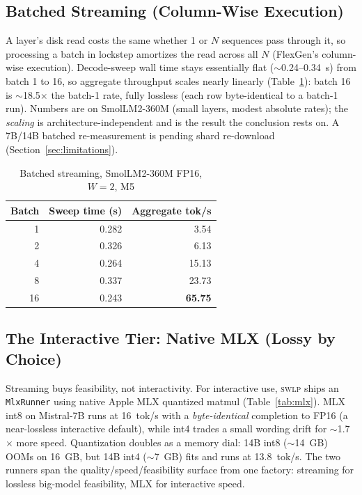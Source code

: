 \documentclass[10pt,a4paper]{article}
\newcommand{\swlp}{\textsc{swlp}}
\begin{document}
\subsection{Batched Streaming (Column-Wise Execution)}
\label{subsec:batch}

A layer's disk read costs the same whether 1 or $N$ sequences pass through it, so
processing a batch in lockstep amortizes the read across all $N$ (FlexGen's
column-wise execution). Decode-sweep wall time stays essentially flat
($\sim$0.24--0.34~s) from batch 1 to 16, so aggregate throughput scales nearly
linearly (Table~\ref{tab:batch}): batch 16 is $\sim$18.5$\times$ the batch-1 rate,
fully lossless (each row byte-identical to a batch-1 run). Numbers are on
SmolLM2-360M (small layers, modest absolute rates); the \emph{scaling} is
architecture-independent and is the result the conclusion rests on. A 7B/14B
batched re-measurement is pending shard re-download (Section~\ref{sec:limitations}).

\begin{table}[htbp]
\centering
\caption{Batched streaming, SmolLM2-360M FP16, $W=2$, M5}
\label{tab:batch}
\begin{tabular}{@{}rrr@{}}
\toprule
\textbf{Batch} & \textbf{Sweep time (s)} & \textbf{Aggregate tok/s} \\
\midrule
1 & 0.282 & 3.54 \\
2 & 0.326 & 6.13 \\
4 & 0.264 & 15.13 \\
8 & 0.337 & 23.73 \\
16 & 0.243 & \textbf{65.75} \\
\bottomrule
\end{tabular}
\end{table}

\subsection{The Interactive Tier: Native MLX (Lossy by Choice)}
\label{subsec:mlx}

Streaming buys feasibility, not interactivity. For interactive use, \swlp{} ships
an \texttt{MlxRunner} using native Apple MLX quantized matmul
(Table~\ref{tab:mlx}). MLX int8 on Mistral-7B runs at 16~tok/s with a
\emph{byte-identical} completion to FP16 (a near-lossless interactive default), while int4 trades a small wording drift for $\sim$1.7$\times$ more speed.
Quantization doubles as a memory dial: 14B int8 ($\sim$14~GB) OOMs on 16~GB, but
14B int4 ($\sim$7~GB) fits and runs at 13.8~tok/s. The two runners span the
quality/speed/feasibility surface from one factory: streaming for lossless
big-model feasibility, MLX for interactive speed.
\end{document}
